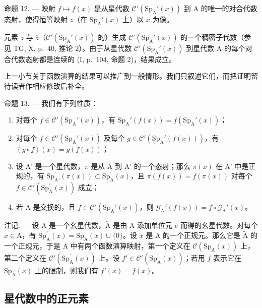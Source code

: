 命题 12. --- 映射 \(f \mapsto f(x)\) 是从星代数 \(\mathcal{C}'(\mathrm{Sp}_{\mathrm{A}}'(x))\) 到 A 的唯一的对合代数态射，使得恒等映射 \(z\)（在 \(\mathrm{Sp}_{\mathrm{A}}'(x)\) 上）以 \(x\) 为像。

元素 \(z\) 与 \(\overline{z}\)（\(\mathcal{C}'(\mathrm{Sp}_{\mathrm{A}}'(x))\) 的）生成 \(\mathcal{C}'(\mathrm{Sp}_{\mathrm{A}}'(x))\) 的一个稠密子代数（参见 TG, X, p.~40, 推论 2）。由于从星代数 \(\mathcal{C}'(\mathrm{Sp}_{\mathrm{A}}'(x))\) 到星代数 A 的每个对合代数态射都是连续的 (I, p.~104, 命题 2)，结果成立。

上一小节关于函数演算的结果可以推广到一般情形。我们只叙述它们，而把证明留待读者作相应修改后补全。

命题 13. --- 我们有下列性质：

\begin{enumerate}
\def\labelenumi{\alph{enumi})}
\item
  对每个 \(f \in \mathcal{C}'(\mathrm{Sp}_{\mathrm{A}}'(x))\)，有 \(\mathrm{Sp}_{\mathrm{A}}'(f(x)) = f(\mathrm{Sp}_{\mathrm{A}}'(x))\)；
\item
  对每个 \(f \in \mathcal{C}'(\mathrm{Sp}_{\mathrm{A}}'(x))\) 及每个 \(g \in \mathcal{C}'(\mathrm{Sp}_{\mathrm{A}}'(f(x)))\)，有 \((g \circ f)(x) = g(f(x))\)；
\item
  设 A' 是一个星代数，\(\pi\) 是从 A 到 A' 的一个态射；那么 \(\pi(x)\) 在 A' 中是正规的，有 \(\mathrm{Sp}_{\mathrm{A}'}^{\prime}(\pi(x)) \subset \mathrm{Sp}_{\mathrm{A}}^{\prime}(x)\)，且 \(\pi(f(x)) = f(\pi(x))\) 对每个 \(f \in \mathcal{C}'(\mathrm{Sp}_{\mathrm{A}}^{\prime}(x))\) 成立；
\item
  若 A 是交换的，且 \(f \in \mathcal{C}'(\mathrm{Sp}_{\mathrm{A}}'(x))\)，则 \(\mathcal{G}_{\mathrm{A}}'(f(x)) = f \circ \mathcal{G}_{\mathrm{A}}'(x)\)。
\end{enumerate}

注记. --- 设 A 是一个幺星代数，\(\widetilde{\mathrm{A}}\) 是由 A 添加单位元 \(e\) 而得的幺星代数。对每个 \(x \in \mathrm{A}\)，有 \(\mathrm{Sp}_{\mathrm{A}}^{\prime}(x) = \mathrm{Sp}_{\mathrm{A}}(x) \cup \{0\}\)。设 \(x\) 是 A 的一个正规元。那么它是 \(\widetilde{\mathrm{A}}\) 的一个正规元，于是 A 中有两个函数演算映射，第一个定义在 \(\mathcal{C}(\mathrm{Sp}_{\mathrm{A}}(x))\) 上，第二个定义在 \(\mathcal{C}'(\mathrm{Sp}_{\mathrm{A}}^{\prime}(x))\) 上。设 \(f' \in \mathcal{C}'(\mathrm{Sp}_{\mathrm{A}}^{\prime}(x))\)；若用 \(f\) 表示它在 \(\mathrm{Sp}_{\mathrm{A}}(x)\) 上的限制，则我们有 \(f'(x) = f(x)\)。

\subsection{星代数中的正元素}


